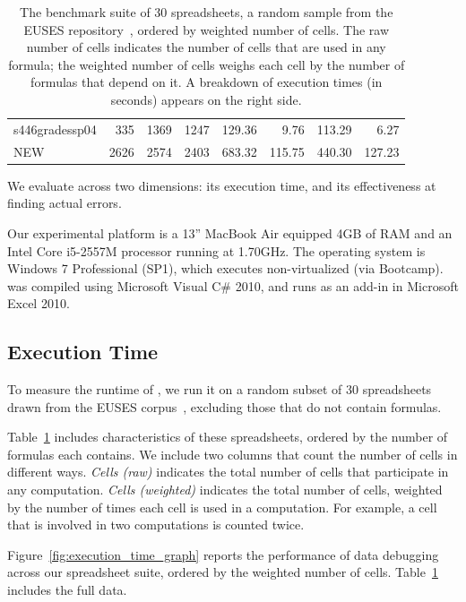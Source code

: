 \begin{table}[!b]
\begin{tabular}{l|rrr||r|rrr}
\small{s446gradessp04} & \small{335} & \small{1369} & \small{1247} & \small{129.36} & \small{9.76} & \small{113.29} & \small{6.27} \\ 
\small{NEW} & \small{2626} & \small{2574} & \small{2403} & \small{683.32} & \small{115.75} & \small{440.30} & \small{127.23} \\ 
    \end{tabular}%
  \caption{The benchmark suite of 30 spreadsheets, a random sample from the EUSES repository~\cite{Fisher:2005:ESC:1082983.1083242}, ordered by weighted number of cells. The raw number of cells indicates the number of cells that are used in any formula; the weighted number of cells weighs each cell by the number of formulas that depend on it. A breakdown of \checkcell{} execution times (in seconds) appears on the right side.\label{tab:spreadsheet_characteristics}}
\end{table}

We evaluate \checkcell{} across two dimensions: its execution time,
and its effectiveness at finding actual errors.

Our experimental platform is a 13'' MacBook Air equipped 4GB of RAM
and an Intel Core i5-2557M processor running at 1.70GHz. The operating
system is Windows 7 Professional (SP1), which executes non-virtualized
(via Bootcamp). \checkcell{} was compiled using Microsoft Visual C\#
2010, and runs as an add-in in Microsoft Excel 2010.

\subsection{Execution Time}
\label{sec:execution_time}

To measure the runtime of \checkcell{}, we run it on a random subset
of 30 spreadsheets drawn from the EUSES
corpus~\cite{Fisher:2005:ESC:1082983.1083242}, excluding those that do not contain
formulas.

Table~\ref{tab:spreadsheet_characteristics} includes characteristics
of these spreadsheets, ordered by the number of formulas each
contains. We include two columns that count the number of cells in
different ways. \emph{Cells (raw)} indicates the total number of cells
that participate in any computation. \emph{Cells (weighted)} indicates
the total number of cells, weighted by the number of times each cell
is used in a computation. For example, a cell that is involved in two
computations is counted twice.

Figure~\ref{fig:execution_time_graph} reports the performance of data
debugging across our spreadsheet suite, ordered by the weighted number
of cells. Table~\ref{tab:spreadsheet_characteristics} includes the full data.


